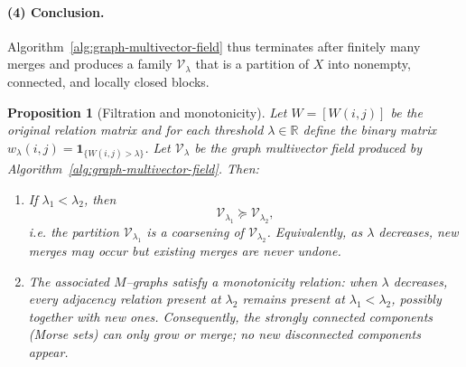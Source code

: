 \documentclass{article}
\theoremstyle{definition}
\theoremstyle{plain}
\newtheorem{proposition}{Proposition}
\theoremstyle{remark}
\newcommand{\1}{\mathbbm{1}}  %
\renewenvironment{proof}{{\bf Proof:\ }}{\qedsymbol}%
\begin{document}
\begin{proof}
\paragraph{(4) Conclusion.}
Algorithm~\ref{alg:graph-multivector-field} thus terminates after finitely
many merges and produces a family \(\mathcal V_\lambda\) that is a partition
of \(X\) into nonempty, connected, and locally closed blocks.
\end{proof}

 

\begin{proposition}[Filtration and monotonicity]
\label{prop:filtration-monotonic}
Let \(W=[W(i,j)]\) be the original relation matrix and for each threshold
\(\lambda\in\mathbb{R}\) define the binary matrix
\(w_\lambda(i,j)=\mathbf{1}_{\{W(i,j)>\lambda\}}\).
Let \(\mathcal V_\lambda\) be the graph multivector field produced by
Algorithm~\ref{alg:graph-multivector-field}. Then:

\begin{enumerate}
\item If \(\lambda_1 < \lambda_2\), then
      \[
      \mathcal V_{\lambda_1} \succeq \mathcal V_{\lambda_2},
      \]
      i.e. the partition \(\mathcal V_{\lambda_1}\) is a coarsening of
      \(\mathcal V_{\lambda_2}\).
      Equivalently, as \(\lambda\) decreases, new merges may occur but
      existing merges are never undone.

\item The associated $M$--graphs satisfy a monotonicity relation:
      when \(\lambda\) decreases, every adjacency relation present at
      \(\lambda_2\) remains present at \(\lambda_1<\lambda_2\),
      possibly together with new ones.  
      Consequently, the strongly connected components (Morse sets)
      can only grow or merge; no new disconnected components appear.
\end{enumerate}
\end{proposition}
\end{document}
